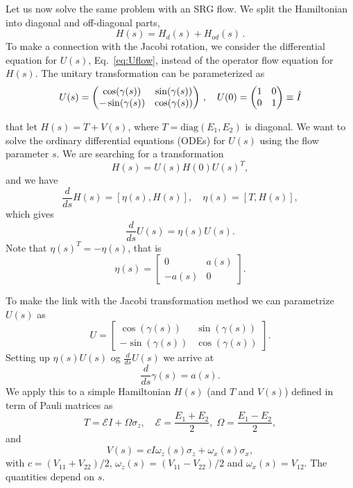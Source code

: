 Let us now solve the same problem with an SRG flow. We split the Hamiltonian
into diagonal and off-diagonal parts,
\begin{equation}
  H(s) = H_d(s) + H_{od}(s)\,.
\end{equation}
To make a connection with the Jacobi rotation, we consider the differential
equation for $U(s)$, Eq.~\eqref{eq:Uflow}, instead of the operator flow equation
for $H(s)$. The unitary transformation can be parameterized as 
\begin{equation}
  U(s) = \begin{pmatrix} \cos(\gamma(s)) & \sin(\gamma(s)) \\ -\sin(\gamma(s)) & \cos(\gamma(s)) \end{pmatrix}\,,
  \quad U(0) = \begin{pmatrix} 1 & 0 \\ 0 & 1 \end{pmatrix} \equiv \hat{I}
\end{equation}


that let $H(s) = T + V(s)$, where $T= \mathrm{diag}(E_1,E_2)$ is diagonal. We want to solve the ordinary differential equations (ODEs) 
for $U(s)$ using the flow parameter $s$. 
We are searching for a transformation 
\[ 
H(s) = U(s)H(0)U(s)^T, 
\]
and we have
\[ 
\frac{d}{ds} H(s) = [\eta(s),H(s)],  \quad \eta(s) = [T,H(s)], 
\]
which gives
\[ 
\frac{d}{ds} U(s) = \eta(s) U(s). 
\]
Note that $\eta(s)^T = -\eta(s)$, that is
\[ 
\eta(s) = \begin{bmatrix} 0 & a(s) \\ -a(s) & 0 \end{bmatrix}. 
\]

To make the link with the Jacobi transformation method
we can parametrize $U(s)$ as
\[ 
U = \begin{bmatrix} \cos(\gamma(s)) & \sin(\gamma(s)) \\ -\sin(\gamma(s)) & \cos(\gamma(s)) \end{bmatrix}. 
\]
Setting up $\eta(s)U(s)$ og $\frac{d}{ds} U(s)$ we arrive at 
\[ 
\frac{d}{ds} \gamma(s) = a(s). 
\]
We apply this to a simple Hamiltonian $H(s)$ (and $T$ and $V(s)$)  defined in term of Pauli matrices  as
\[ 
T = \mathcal{E} I + \Omega \sigma_z, \quad \mathcal{E} = \frac{E_1+ E_2}{2}, \; \Omega = \frac{E_1-E_2}{2}, 
\]
and
\[ 
V(s) = c I \omega_z(s)\sigma_z + \omega_x(s)\sigma_x, 
\]
with $c = (V_{11}+V_{22})/2$, $\omega_z(s) = (V_{11}-V_{22})/2$ and $\omega_x(s) = V_12$. The quantities depend on
$s$. 

